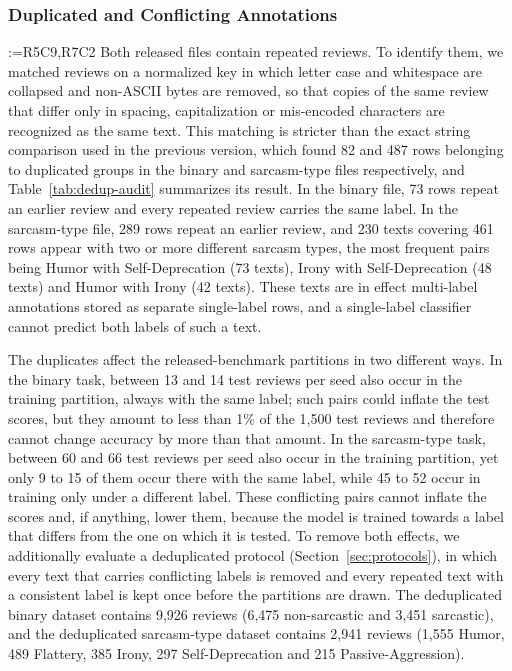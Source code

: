 \documentclass[a4paper,fleqn]{cas-sc}
\makeatletter
\newif\iftracked
\newcommand{\rv@setcolour}[1]{%
  \IfStrEq{#1}{R7C7}{\color{rvEdit}}{%
    \IfSubStr{#1}{R5}{\IfSubStr{#1}{R7}{\color{rvBoth}}{\color{rvFive}}}{\color{rvSeven}}}}
\newcommand{\rv@tag}[1]{\textsuperscript{\sffamily\bfseries\scriptsize[\StrSubstitute{#1}{,}{, }]}\,}
\newcommand{\rv@recordone}[1]{%
  \edef\rv@i{#1}%
  \ifcsdef{rv@n@\rv@i}{}{\csgdef{rv@n@\rv@i}{0}}%
  \csxdef{rv@n@\rv@i}{\the\numexpr\csuse{rv@n@\rv@i}+1\relax}%
  \begingroup\edef\@currentlabel{\rv@i}\label{rv:\rv@i:\csuse{rv@n@\rv@i}}\endgroup}
\newcommand{\rv@record}[1]{\@for\rv@id:=#1\do{\expandafter\rv@recordone\expandafter{\rv@id}}}
\DeclareRobustCommand{\rcx}[2]{\iftracked{\rv@setcolour{#1}\rv@tag{#1}#2}\else#2\fi}
\newenvironment{rcblock}[1]{\rv@record{#1}\iftracked\rv@setcolour{#1}\leavevmode\rv@tag{#1}\fi\ignorespaces}{\par}
\makeatother
\begin{document}
\subsubsection{\texorpdfstring{\rcx{R5C9,R7C2}{Duplicated and Conflicting Annotations}}{Duplicated and Conflicting Annotations}}
\label{sec:duplicates}
\begin{rcblock}{R5C9,R7C2}
Both released files contain repeated reviews. To identify them, we matched reviews on a normalized key in which letter case and whitespace are collapsed and non-ASCII bytes are removed, so that copies of the same review that differ only in spacing, capitalization or mis-encoded characters are recognized as the same text. This matching is stricter than the exact string comparison used in the previous version, which found 82 and 487 rows belonging to duplicated groups in the binary and sarcasm-type files respectively, and Table~\ref{tab:dedup-audit} summarizes its result. In the binary file, 73 rows repeat an earlier review and every repeated review carries the same label. In the sarcasm-type file, 289 rows repeat an earlier review, and 230 texts covering 461 rows appear with two or more different sarcasm types, the most frequent pairs being Humor with Self-Deprecation (73 texts), Irony with Self-Deprecation (48 texts) and Humor with Irony (42 texts). These texts are in effect multi-label annotations stored as separate single-label rows, and a single-label classifier cannot predict both labels of such a text.

The duplicates affect the released-benchmark partitions in two different ways. In the binary task, between 13 and 14 test reviews per seed also occur in the training partition, always with the same label; such pairs could inflate the test scores, but they amount to less than 1\% of the 1,500 test reviews and therefore cannot change accuracy by more than that amount. In the sarcasm-type task, between 60 and 66 test reviews per seed also occur in the training partition, yet only 9 to 15 of them occur there with the same label, while 45 to 52 occur in training only under a different label. These conflicting pairs cannot inflate the scores and, if anything, lower them, because the model is trained towards a label that differs from the one on which it is tested. To remove both effects, we additionally evaluate a deduplicated protocol (Section~\ref{sec:protocols}), in which every text that carries conflicting labels is removed and every repeated text with a consistent label is kept once before the partitions are drawn. The deduplicated binary dataset contains 9,926 reviews (6,475 non-sarcastic and 3,451 sarcastic), and the deduplicated sarcasm-type dataset contains 2,941 reviews (1,555 Humor, 489 Flattery, 385 Irony, 297 Self-Deprecation and 215 Passive-Aggression).
\end{rcblock}
\end{document}
